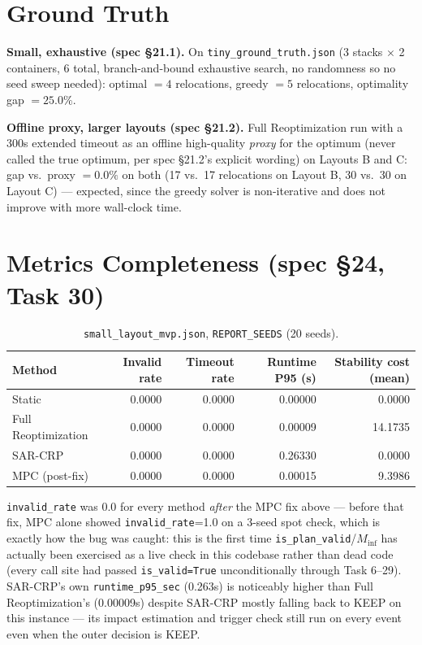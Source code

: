 \documentclass[11pt]{article}
\begin{document}
\section{Ground Truth}

\textbf{Small, exhaustive (spec \S21.1).} On \texttt{tiny\_ground\_truth.json}
(3 stacks $\times$ 2 containers, 6 total, branch-and-bound exhaustive
search, no randomness so no seed sweep needed): optimal $=4$ relocations,
greedy $=5$ relocations, optimality gap $=25.0\%$.

\textbf{Offline proxy, larger layouts (spec \S21.2).} Full Reoptimization
run with a 300s extended timeout as an offline high-quality
\emph{proxy} for the optimum (never called the true optimum, per spec
\S21.2's explicit wording) on Layouts B and C: gap vs.\ proxy $=0.0\%$ on
both (17 vs.\ 17 relocations on Layout B, 30 vs.\ 30 on Layout C) --- expected,
since the greedy solver is non-iterative and does not improve with more
wall-clock time.

\section{Metrics Completeness (spec \S24, Task 30)}

\begin{table}[h]
\centering
\small
\begin{tabular}{lrrrr}
\hline
Method & Invalid rate & Timeout rate & Runtime P95 (s) & Stability cost (mean) \\
\hline
Static & 0.0000 & 0.0000 & 0.00000 & 0.0000 \\
Full Reoptimization & 0.0000 & 0.0000 & 0.00009 & 14.1735 \\
SAR-CRP & 0.0000 & 0.0000 & 0.26330 & 0.0000 \\
MPC (post-fix) & 0.0000 & 0.0000 & 0.00015 & 9.3986 \\
\hline
\end{tabular}
\caption{\texttt{small\_layout\_mvp.json}, \texttt{REPORT\_SEEDS} (20 seeds).}
\end{table}

\texttt{invalid\_rate} was 0.0 for every method \emph{after} the MPC fix
above --- before that fix, MPC alone showed \texttt{invalid\_rate}=1.0 on
a 3-seed spot check, which is exactly how the bug was caught: this is the
first time \texttt{is\_plan\_valid}/$M_{\mathrm{inf}}$ has actually been
exercised as a live check in this codebase rather than dead code (every
call site had passed \texttt{is\_valid=True} unconditionally through Task
6--29). SAR-CRP's own \texttt{runtime\_p95\_sec} (0.263s) is noticeably
higher than Full Reoptimization's (0.00009s) despite SAR-CRP mostly
falling back to KEEP on this instance --- its impact estimation and
trigger check still run on every event even when the outer decision is
KEEP.
\end{document}
